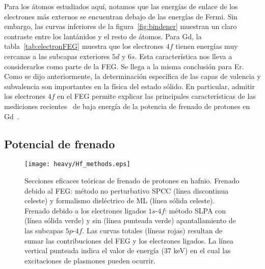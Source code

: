 Para los átomos estudiados aquí, notamos que las energías de enlace de 
los electrones más externos se encuentran debajo de las energías de 
Fermi. Sin embargo, las curvas inferiores de la figura~\ref{fig:bindener} 
muestran un claro contraste entre los lantánidos y el resto de átomos. 
Para Gd, la tabla~\ref{tab:electronFEG} muestra que los electrones $4f$ 
tienen energías muy cercanas a las subcapas exteriores $5d$ y $6s$. Esta 
característica nos lleva a considerarlos como parte de la FEG. Se llega 
a la misma conclusión para Er. Como se dijo anteriormente, la 
determinación específica de las capas de valencia y subvalencia son 
importantes en la física del estado sólido. En particular, admitir los 
electrones $4f$ en el FEG permite explicar las principales características 
de las mediciones recientes~\cite{Montanari:17,Montanari:19} de baja 
energía de la potencia de frenado de protones en Gd~\cite{Roth:17}.


\subsection{Potencial de frenado}
\label{subsec:results-stopping}


\begin{figure}[H]
\centering
\texttt{[image: heavy/Hf\_methods.eps]}
\caption[Secciones eficaces teóricas de frenado de protones en Hf.]
{Secciones eficaces teóricas de frenado de protones en hafnio.
Frenado debido al FEG: método no perturbativo SPCC (línea discontinua 
celeste) y formalismo dieléctrico de ML (línea sólida celeste). 
Frenado debido a los electrones ligados $1s$-$4f$: método SLPA con (línea 
sólida verde) y sin (línea punteada verde) apantallamiento de las 
subcapas $5p$-$4f$. 
Las curvas totales (líneas rojas) resultan de sumar las contribuciones 
del FEG y los electrones ligados. 
La línea vertical punteada indica el valor de energía (37 keV) en el cual 
las excitaciones de plasmones pueden ocurrir.} 
\label{fig:Hf_methods}
\end{figure}

